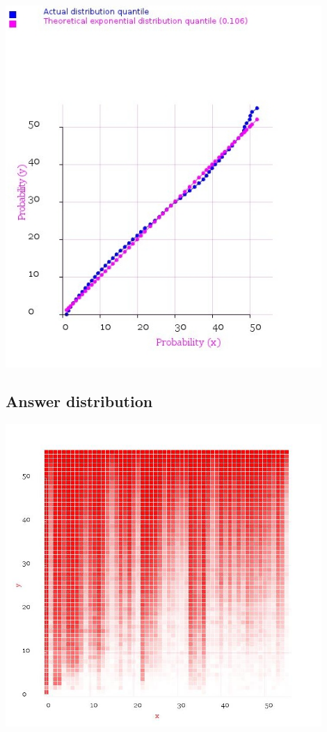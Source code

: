\documentclass[10pt]{article}
\begin{document}
\includegraphics[width=120mm]{ReportMedia/QQPlotPostVsExponential.jpg}
\newpage
\subsection{Answer distribution}
\includegraphics[width=120mm]{ReportMedia/AnswerDistribution.jpg}
\end{document}
